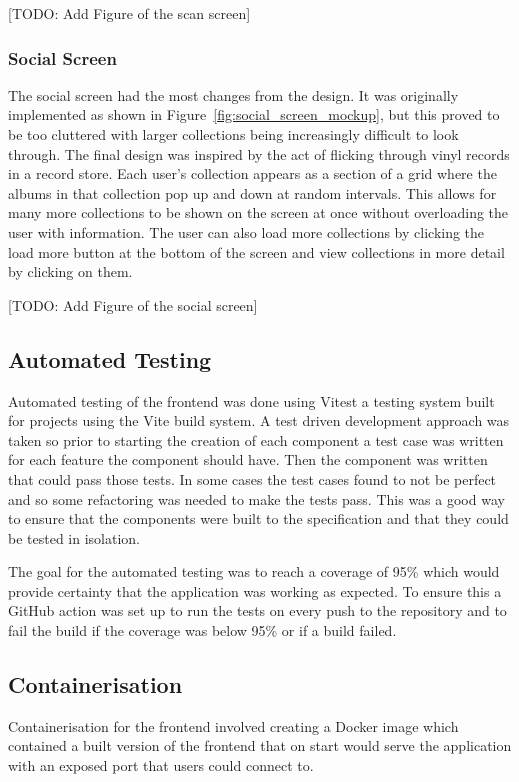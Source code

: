 [TODO: Add Figure of the scan screen]

\subsubsection{Social Screen}
The social screen had the most changes from the design. It was originally implemented as shown in Figure~\ref{fig:social_screen_mockup}, but this proved to be too cluttered with larger collections being increasingly difficult to look through. The final design was inspired by the act of flicking through vinyl records in a record store. Each user's collection appears as a section of a grid where the albums in that collection pop up and down at random intervals. This allows for many more collections to be shown on the screen at once without overloading the user with information. The user can also load more collections by clicking the load more button at the bottom of the screen and view collections in more detail by clicking on them.

[TODO: Add Figure of the social screen]

\subsection{Automated Testing}
Automated testing of the frontend was done using Vitest a testing system built for projects using the Vite build system. A test driven development approach was taken so prior to starting the creation of each component a test case was written for each feature the component should have. Then the component was written that could pass those tests. In some cases the test cases found to not be perfect and so some refactoring was needed to make the tests pass. This was a good way to ensure that the components were built to the specification and that they could be tested in isolation.

The goal for the automated testing was to reach a coverage of 95\% which would provide certainty that the application was working as expected. To ensure this a GitHub action was set up to run the tests on every push to the repository and to fail the build if the coverage was below 95\% or if a build failed.

\subsection{Containerisation}
Containerisation for the frontend involved creating a Docker image which contained a built version of the frontend that on start would serve the application with an exposed port that users could connect to.

